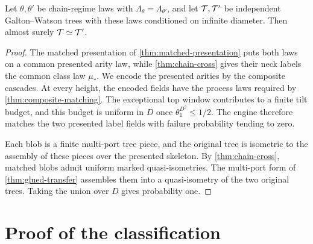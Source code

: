 \begin{proposition}
\label{thm:chain-general}
\leanok
{}
Let $\theta,\theta'$ be chain-regime laws with $\Lambda_{\theta}=\Lambda_{\theta'}$, and let
$\mathcal{T},\mathcal{T}'$ be independent Galton--Watson trees with these laws conditioned on infinite
diameter. Then almost surely $\mathcal{T}\simeq\mathcal{T}'$.
\end{proposition}

\begin{proof}
\leanok
{}
The matched presentation of \cref{thm:matched-presentation} puts both laws on a common presented
arity law, while \cref{thm:chain-cross} gives their neck labels the common class law $\mu_*$. We
encode the presented arities by the composite cascades. At every height, the encoded fields have
the process laws required by \cref{thm:composite-matching}. The exceptional top window contributes
to a finite tilt budget, and this budget is uniform in $D$ once
$\theta_1^{D^2}\leq1/2$. The engine therefore matches the two presented label fields with failure
probability tending to zero.

Each blob is a finite multi-port tree piece, and the original tree is isometric to the assembly of
these pieces over the presented skeleton. By \cref{thm:chain-cross}, matched blobs admit uniform
marked quasi-isometries. The multi-port form of \cref{thm:glued-transfer} assembles them into a
quasi-isometry of the two original trees. Taking the union over $D$ gives probability one.
\end{proof}

\section{Proof of the classification}

